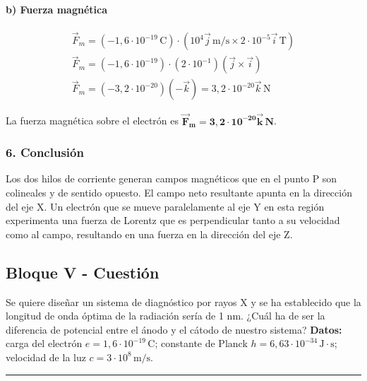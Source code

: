 \paragraph*{b) Fuerza magnética}
\begin{gather}
    \vec{F}_m = (-1,6 \cdot 10^{-19} \, \text{C}) \cdot (10^4 \vec{j} \, \text{m/s} \times 2 \cdot 10^{-5} \vec{i} \, \text{T}) \\
    \vec{F}_m = (-1,6 \cdot 10^{-19}) \cdot (2 \cdot 10^{-1}) (\vec{j} \times \vec{i}) \\
    \vec{F}_m = (-3,2 \cdot 10^{-20}) (-\vec{k}) = 3,2 \cdot 10^{-20} \vec{k} \, \text{N}
\end{gather}
\begin{cajaresultado}
    La fuerza magnética sobre el electrón es $\boldsymbol{\vec{F}_m = 3,2 \cdot 10^{-20} \vec{k} \, \textbf{N}}$.
\end{cajaresultado}

\subsubsection*{6. Conclusión}
\begin{cajaconclusion}
Los dos hilos de corriente generan campos magnéticos que en el punto P son colineales y de sentido opuesto. El campo neto resultante apunta en la dirección del eje X. Un electrón que se mueve paralelamente al eje Y en esta región experimenta una fuerza de Lorentz que es perpendicular tanto a su velocidad como al campo, resultando en una fuerza en la dirección del eje Z.
\end{cajaconclusion}

\newpage

\subsection{Bloque V - Cuestión}
\label{subsec:A5_2010_sep_ext}

\begin{cajaenunciado}
Se quiere diseñar un sistema de diagnóstico por rayos X y se ha establecido que la longitud de onda óptima de la radiación sería de 1 nm. ¿Cuál ha de ser la diferencia de potencial entre el ánodo y el cátodo de nuestro sistema?
\textbf{Datos:} carga del electrón $e=1,6\cdot10^{-19}\,\text{C}$; constante de Planck $h=6,63\cdot10^{-34}\,\text{J}\cdot\text{s}$; velocidad de la luz $c=3\cdot10^{8}\,\text{m/s}$.
\end{cajaenunciado}
\hrule

